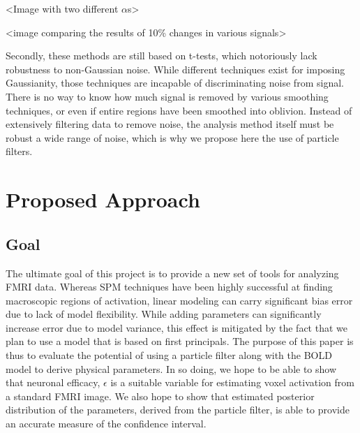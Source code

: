 \documentclass{article}
\begin{document}
<Image with two different $\alpha$s>

<image comparing the results of 10\% changes in various signals>

Secondly, these methods are still based on t-tests, which notoriously
lack robustness to non-Gaussian noise. While different techniques 
exist for imposing Gaussianity, those techniques are incapable of
discriminating noise from signal. There is no way to know how much 
signal is removed by various smoothing techniques, or even if entire 
regions have been smoothed into oblivion. Instead of extensively filtering data to 
remove noise, the analysis method itself must be robust a wide range of noise,
which is why we propose here the use of particle filters.

\section*{Proposed Approach}
\subsection*{Goal}
The ultimate goal of this project is to provide a new set of tools
for analyzing FMRI data. Whereas SPM techniques have been highly 
successful at finding macroscopic regions of activation, linear 
modeling can carry significant bias error due to lack of model
flexibility. While adding parameters can significantly increase
error due to model variance, this effect is mitigated by the fact
that we plan to use a model that is based on first principals. The
purpose of this paper is thus to evaluate the potential of using
a particle filter along with the BOLD model to derive physical 
parameters. In so doing, we hope to be able to show that neuronal
efficacy, $\epsilon$ is a suitable variable for estimating voxel 
activation from a standard FMRI image. We also hope to show that 
estimated posterior distribution of the parameters, derived from
the particle filter, is able to provide an accurate measure of the
confidence interval.
\end{document}
